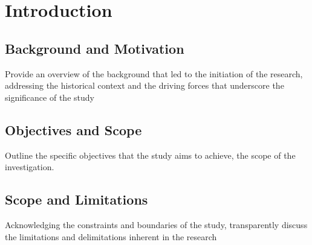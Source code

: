 \chapter{Introduction}
\label{chap:Introduction} 

\section{Background and Motivation}
Provide an overview of the background that led to the initiation of the research, addressing the historical context and the driving forces that underscore the significance of the study

\section{Objectives and Scope}
Outline the specific objectives that the study aims to achieve, the scope of the investigation.

\section{Scope and Limitations}
Acknowledging the constraints and boundaries of the study, transparently discuss the limitations and delimitations inherent in the research
